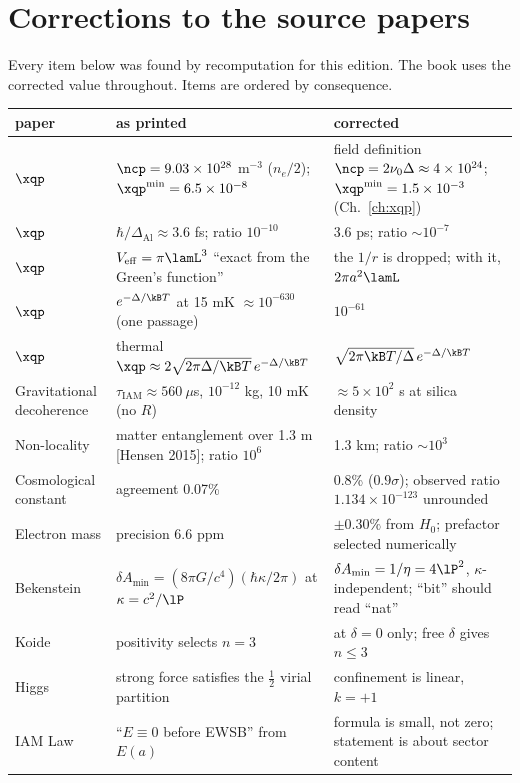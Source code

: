\chapter{Corrections to the source papers}\label{app:errata}

Every item below was found by recomputation for this edition. The book uses the corrected
value throughout. Items are ordered by consequence.

{\small
\begin{longtable}{@{}p{}p{}p{}@{}}
\toprule
paper & as printed & corrected \\\midrule\endhead
$\xqp$ & $\ncp=9.03\times10^{28}$ m$^{-3}$ ($n_e/2$); $\xqp^{\min}=6.5\times10^{-8}$ & field definition $\ncp=2\nu_0\Delta\approx4\times10^{24}$; $\xqp^{\min}=1.5\times10^{-3}$ (Ch.~\ref{ch:xqp}) \\
$\xqp$ & $\hbar/\Delta_{\mathrm{Al}}\approx3.6$ fs; ratio $10^{-10}$ & 3.6 ps; ratio $\sim10^{-7}$ \\
$\xqp$ & $V_{\mathrm{eff}}=\pi\lamL^3$ ``exact from the Green's function'' & the $1/r$ is dropped; with it, $2\pi a^2\lamL$ \\
$\xqp$ & $e^{-\Delta/\kB T}$ at 15 mK $\approx10^{-630}$ (one passage) & $10^{-61}$ \\
$\xqp$ & thermal $\xqp\approx2\sqrt{2\pi\Delta/\kB T}\,e^{-\Delta/\kB T}$ & $\sqrt{2\pi\kB T/\Delta}\,e^{-\Delta/\kB T}$ \\
Gravitational decoherence & $\tau_{\mathrm{IAM}}\approx560\ \mu$s, $10^{-12}$ kg, 10 mK (no $R$) & $\approx5\times10^2$ s at silica density \\
Non-locality & matter entanglement over 1.3 m [Hensen 2015]; ratio $10^6$ & 1.3 km; ratio $\sim10^3$ \\
Cosmological constant & agreement 0.07\% & 0.8\% ($0.9\sigma$); observed ratio $1.134\times10^{-123}$ unrounded \\
Electron mass & precision 6.6 ppm & $\pm0.30\%$ from $H_0$; prefactor selected numerically \\
Bekenstein & $\delta A_{\min}=(8\pi G/c^4)(\hbar\kappa/2\pi)$ at $\kappa=c^2/\lP$ & $\delta A_{\min}=1/\eta=4\lP^2$, $\kappa$-independent; ``bit'' should read ``nat'' \\
Koide & positivity selects $n=3$ & at $\delta=0$ only; free $\delta$ gives $n\le3$ \\
Higgs & strong force satisfies the $\tfrac12$ virial partition & confinement is linear, $k=+1$ \\
IAM Law & ``$E\equiv0$ before EWSB'' from $E(a)$ & formula is small, not zero; statement is about sector content \\

\end{longtable}}
